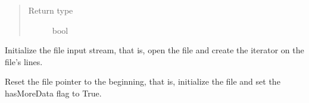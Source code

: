 \documentclass[letterpaper,10pt,english]{sphinxmanual}
\begin{document}
\begin{fulllineitems}
\begin{fulllineitems}
\begin{quote}
\begin{description}
\item[{Return type}] \leavevmode
bool

\end{description}\end{quote}

\end{fulllineitems}


\begin{fulllineitems}
\label{common:common_data_importer.CommonFileDataImporter.init_file_input_stream}
Initialize the file input stream, that is, open the file and create the iterator on the file's lines.

\end{fulllineitems}


\begin{fulllineitems}
\label{common:common_data_importer.CommonFileDataImporter.rewind}
Reset the file pointer to the beginning, that is, initialize the file and set the hasMoreData flag to True.

\end{fulllineitems}


\end{fulllineitems}

\end{document}
